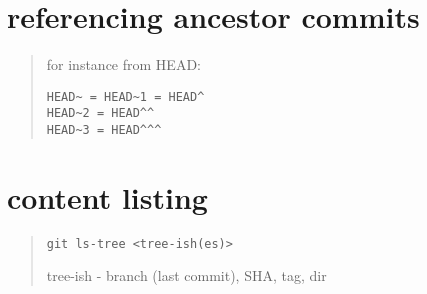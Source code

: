 \documentclass{report}
\begin{document}
\section{referencing ancestor commits}
\begin{quote}
for instance from HEAD:
\begin{verbatim}
HEAD~ = HEAD~1 = HEAD^
HEAD~2 = HEAD^^
HEAD~3 = HEAD^^^
\end{verbatim}
\end{quote}

\section{content listing}
\begin{quote}
\begin{verbatim}
git ls-tree <tree-ish(es)>
\end{verbatim}
tree-ish - branch (last commit), SHA, tag, dir
\end{quote}
\end{document}
